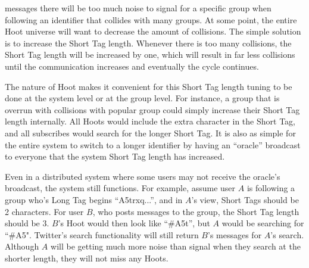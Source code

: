 %

messages  there will be too much noise to signal for a specific group when following an identifier that collides with many groups. At some point, the entire Hoot universe will want to decrease the amount of collisions. The simple solution is to increase the Short Tag length. Whenever there is too many collisions, the Short Tag length will be increased by one, which will result in far less collisions until the communication increases and eventually the cycle continues. 

The nature of Hoot makes it convenient for this Short Tag length tuning to be done at the system level or at the group level. For instance, a group that is overrun with collisions with popular group could simply increase their Short Tag length internally. All Hoots would include the extra character in the Short Tag, and all subscribes would search for the longer Short Tag. It is also as simple for the entire system to switch to a longer identifier by having an ``oracle'' broadcast to everyone that the system Short Tag length has increased.

Even in a distributed system where some users may not receive the oracle's broadcast, the system still functions. For example, assume user $A$ is following a group who's Long Tag begins ``A5trxq...'', and in $A$'s view, Short Tags should be 2 characters. For user $B$, who posts messages to the group, the Short Tag length should be 3. $B$'s Hoot would then look like ``\#A5t'', but $A$ would be searching for ``\#A5". Twitter's search functionality will still return $B$'s messages for $A$'s search. Although $A$ will be getting much more noise than signal when they search at the shorter length, they will not miss any Hoots.

